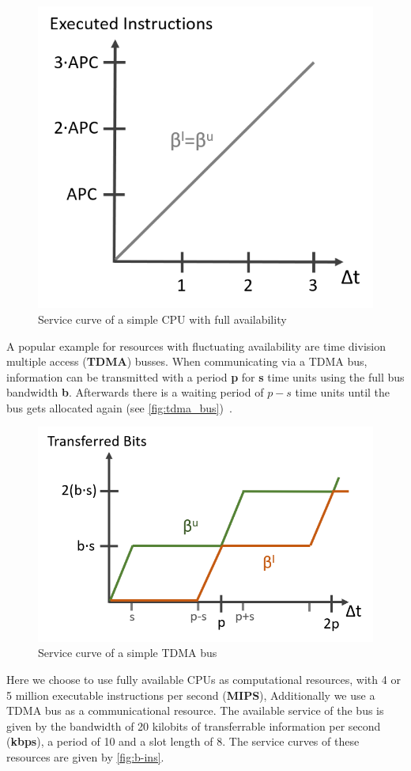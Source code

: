 \begin{figure}
    \centering
    \includegraphics[width=0.6\columnwidth]{graphics/simple_cpu.png}
    \caption{Service curve of a simple CPU with full availability}\label{fig:simple_cpu}
\end{figure}

A popular example for resources with fluctuating availability are time division multiple access (\textbf{TDMA}) busses.
When communicating via a TDMA bus, information can be transmitted with a period \textbf{p} for \textbf{s} time units using the full bus bandwidth \textbf{b}.
Afterwards there is a waiting period of \(p-s\) time units until the bus gets allocated again (see \autoref{fig:tdma_bus})~\cite{mar}.

\begin{figure}
    \centering
    \includegraphics[width=0.8\columnwidth]{graphics/tdma_bus.png}
    \caption{Service curve of a simple TDMA bus}\label{fig:tdma_bus}
\end{figure}


Here we choose to use fully available CPUs as computational resources, with 4 or 5 million executable instructions per second (\textbf{MIPS}),
Additionally we use a TDMA bus as a communicational resource.
The available service of the bus is given by the bandwidth of 20 kilobits of transferrable information per second (\textbf{kbps}), a period of 10 and a slot length of 8.
The service curves of these resources are given by \autoref{fig:b-ins}.

